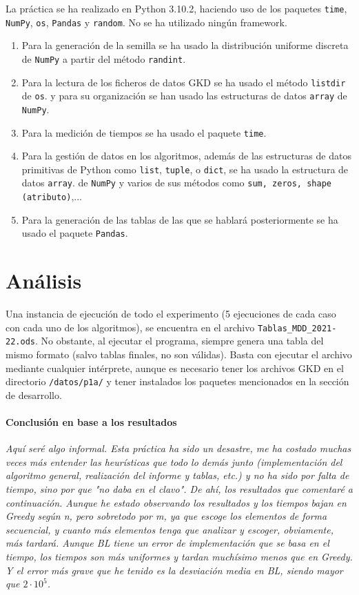 \documentclass{article}
\begin{document}
    La práctica se ha realizado en Python 3.10.2, haciendo uso de los paquetes \texttt{time},
    \texttt{NumPy}, \texttt{os}, \texttt{Pandas} y \texttt{random}. No se ha utilizado ningún framework.
    \begin{enumerate}
        \item[]Para la generación de la semilla se ha usado la distribución uniforme discreta de \texttt{NumPy}
        a partir del método \texttt{randint}.
        \item[]Para la lectura de los ficheros de datos GKD se ha usado el método \texttt{listdir} de \texttt{os}.
        y para su organización se han usado las estructuras de datos \texttt{array} de \texttt{NumPy}.
        \item[]Para la medición de tiempos se ha usado el paquete \texttt{time}.
        \item[]Para la gestión de datos en los algoritmos, además de las estructuras de datos primitivas de 
        Python como \texttt{list}, \texttt{tuple}, o \texttt{dict}, se ha usado la estructura de datos \texttt{array}.
        de \texttt{NumPy} y varios de sus métodos como \texttt{sum, zeros, shape (atributo)},...
        \item[]Para la generación de las tablas de las que se hablará posteriormente se ha usado el paquete \texttt{Pandas}.
    \end{enumerate}

    \section{Análisis}

    Una instancia de ejecución de todo el experimento (5 ejecuciones de cada caso con cada uno de los algoritmos),
    se encuentra en el archivo \texttt{Tablas\_MDD\_2021-22.ods}. No obstante, al ejecutar el programa, siempre genera
    una tabla del mismo formato (salvo tablas finales, no son válidas). Basta con ejecutar el archivo mediante cualquier
    intérprete, aunque es necesario tener los archivos GKD en el directorio \texttt{/datos/p1a/} y tener instalados los paquetes mencionados
    en la sección de desarrollo.

    \paragraph*{\textbf{Conclusión en base a los resultados}}
    \emph{
        Aquí seré algo informal. Esta práctica ha sido un desastre, me ha costado muchas veces más entender las
        heurísticas que todo lo demás junto (implementación del algoritmo general, realización del informe y tablas, etc.)
        y no ha sido por falta de tiempo, sino por que "no daba en el clavo". De ahí, los resultados que comentaré a continuación.
        Aunque he estado observando los resultados y los tiempos bajan en Greedy según n, pero sobretodo por m, ya que escoge los elementos de
        forma secuencial, y cuanto más elementos tenga que analizar y escoger, obviamente, más tardará. Aunque BL tiene un error de
        implementación que se basa en el tiempo, los tiempos son más uniformes y tardan muchísimo menos que en Greedy.
        Y el error más grave que he tenido es la desviación media en BL, siendo mayor que $2\cdot 10^5$.
    }
\end{document}
